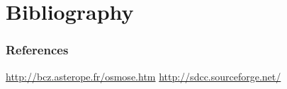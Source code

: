 \documentclass{beamer}
\begin{document}
\section{Bibliography}
\begin{frame}
    \frametitle{References}
    \begin{thebibliography}{9}
             \url{http://bcz.asterope.fr/osmose.htm}
             \url{http://sdcc.sourceforge.net/}
    \end{thebibliography}
\end{frame}
\end{document}
